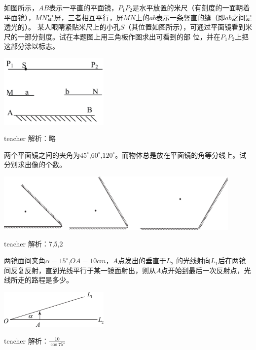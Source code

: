 \begin{example}
如图所示，$AB$表示一平直的平面镜，$P_1P_2$是水平放置的米尺（有刻度的一面朝着平面镜），$MN$是屏，三者相互平行，屏$ MN$上的$ ab$表示一条竖直的缝（即$ ab$之间是透光的）。
某人眼睛紧贴米尺上的小孔$ S（$其位置如图所示），可通过平面镜看到米尺的一部分刻度。试在本题图上用三角板作图求出可看到的部
位，并在$P_1P_2$上把这部分涂以标志。
	\begin{center}
		\includegraphics[width = 0.4\textwidth]{images/opt-1.pdf} 
	\end{center}
\begin{taggedblock}{teacher}
\noindent
解析：略
\end{taggedblock}
\end{example}


\begin{example}
两个平面镜之间的夹角为$45^\circ$,$60^\circ$,$120^\circ$。而物体总是放在平面镜的角等分线上。试分别求出像的个数。
	\begin{center}
		\includegraphics[width = 0.9\textwidth]{images/opt-2.pdf} 
	\end{center}
	\begin{taggedblock}{teacher}
		\noindent
		解析：7,5,2
	\end{taggedblock}
\end{example}

\begin{example}
	两镜面间夹角$\alpha =15^\circ$,$OA=10\si{cm}$，$A$点发出的垂直于$L_2$ 的光线射向$L_1$后在两镜间反复反射，直到光线平行于某一镜面射出，则从$A$点开始到最后一次反射点，光线所走的路程是多少。
		\begin{center}
			\includegraphics[width = 0.4\textwidth]{images/opt-3.pdf} 
		\end{center}
	\begin{taggedblock}{teacher}
		\noindent
		解析：$\frac{10}{\cos75\si{\degree}}$
	\end{taggedblock}
\end{example}

